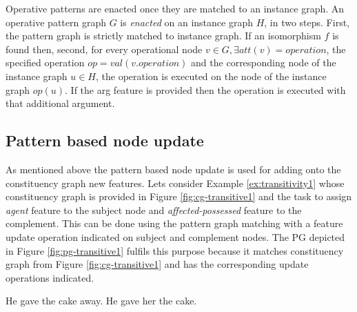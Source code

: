 Operative patterns are enacted once they are matched to an instance graph. 
An operative pattern graph $G$ is \textit{enacted} on an instance graph $H$, in two steps. First, the pattern graph is strictly matched to instance graph. If an isomorphism $f$ is found then, second, for every operational node $v \in G, \exists att(v)=operation$, the specified operation $op = val(v.operation)$ and the corresponding node of the instance graph $u \in H$, the operation is executed on the node of the instance graph $op(u)$. If the arg feature is provided then the operation is executed with that additional argument. 

\subsection{Pattern based node update} 

As mentioned above the pattern based node update is used for adding onto the constituency graph new features. Lets consider Example \ref{ex:transitivity1} whose constituency graph is provided in Figure \ref{fig:cg-transitive1} and the task to assign \textit{agent} feature to the subject node and \textit{affected-possessed} feature to the complement. This can be done using the pattern graph matching with a feature update operation indicated on subject and complement nodes. The PG depicted in Figure \ref{fig:pg-transitive1} fulfils this purpose because it matches constituency graph from Figure \ref{fig:cg-transitive1} and has the corresponding update operations indicated.

\begin{exe}
    \ex\label{ex:transitivity1} He gave the cake away.
    \ex\label{ex:transitivity2} He gave her the cake.
\end{exe}


